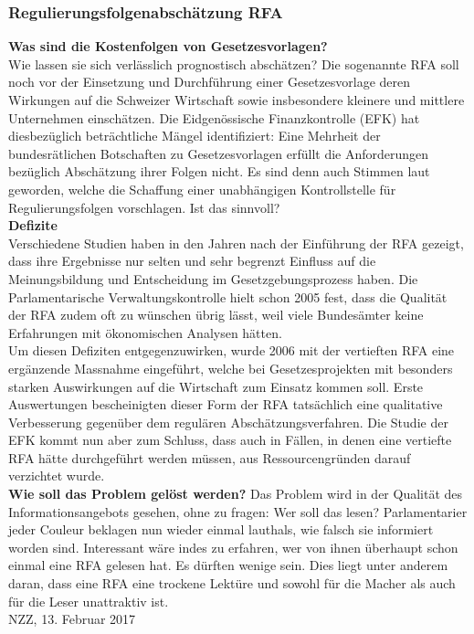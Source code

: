\subsubsection{Regulierungsfolgenabschätzung RFA}
\textbf{Was sind die Kostenfolgen von Gesetzesvorlagen?}\\
Wie lassen sie sich verlässlich prognostisch abschätzen? Die sogenannte RFA soll noch vor der Einsetzung und Durchführung einer Gesetzesvorlage deren Wirkungen auf die Schweizer Wirtschaft sowie insbesondere kleinere und mittlere Unternehmen einschätzen. Die Eidgenössische Finanzkontrolle (EFK) hat diesbezüglich beträchtliche Mängel identifiziert: Eine Mehrheit der bundesrätlichen Botschaften zu Gesetzesvorlagen erfüllt die Anforderungen bezüglich Abschätzung ihrer Folgen nicht. Es sind denn auch Stimmen laut geworden, welche die Schaffung einer unabhängigen Kontrollstelle für Regulierungsfolgen vorschlagen. Ist das sinnvoll?\\
\textbf{Defizite}\\
Verschiedene Studien haben in den Jahren nach der Einführung der RFA gezeigt, dass ihre Ergebnisse nur selten und sehr begrenzt Einfluss auf die Meinungsbildung und Entscheidung im Gesetzgebungsprozess haben. Die Parlamentarische Verwaltungskontrolle hielt schon 2005 fest, dass die Qualität der RFA zudem oft zu wünschen übrig lässt, weil viele Bundesämter keine Erfahrungen mit ökonomischen Analysen hätten.\\
Um diesen Defiziten entgegenzuwirken, wurde 2006 mit der vertieften RFA eine ergänzende Massnahme eingeführt, welche bei Gesetzesprojekten mit besonders starken Auswirkungen auf die Wirtschaft zum Einsatz kommen soll. Erste Auswertungen bescheinigten dieser Form der RFA tatsächlich eine qualitative Verbesserung gegenüber dem regulären Abschätzungsverfahren. Die Studie der EFK kommt nun aber zum Schluss, dass auch in Fällen, in denen eine vertiefte RFA hätte durchgeführt werden müssen, aus Ressourcengründen darauf verzichtet wurde.\\
\textbf{Wie soll das Problem gelöst werden?}
Das Problem wird in der Qualität des Informationsangebots gesehen, ohne zu fragen: Wer soll das lesen? Parlamentarier jeder Couleur beklagen nun wieder einmal lauthals, wie falsch sie informiert worden sind. Interessant wäre indes zu erfahren, wer von ihnen überhaupt schon einmal eine RFA gelesen hat. Es dürften wenige sein. Dies liegt unter anderem daran, dass eine RFA eine trockene Lektüre und sowohl für die Macher als auch für die Leser unattraktiv ist.\\
\vspace{\baselineskip}
\small{NZZ, 13. Februar 2017}

\clearpage
\pagebreak